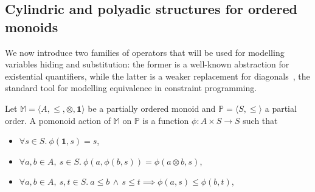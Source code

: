 \documentclass{llncs}
\newcommand{\comment}[1]{}
\def\monid{{\mathbf 0}}
\def\monop{\otimes}
\def\odiv{\, {\ominus\hspace{-7.7pt} \div} \,}
\def\monid{\mathbf{1}}
\begin{document}
\comment{
\begin{example}
\label{notdistr}
Let us consider the monoid $S = \langle \{p,u,n,t\}, \otimes_s, u \rangle$ (with $t$ the top 
of three otherwise unrelated elements): 
$p$ and $n$ intuitively represent the sign of an integer, $t$ tells us that 
the sign cannot be determined, $u$ is the zero
and $\otimes_s$ (which is idempotent) tells us the sign of the addition of two integers, so that 
for all elements $x$ we have
\[x \otimes_s x = u \otimes_s x = x \mbox{  and  } t \otimes_s x = p \otimes_s n = t\]
%
We now add the bottom, in order to obtain a complete lattice.
The $\otimes_s$ is extended in the expected way,  so that $\bot$ is absorbing.
%
Intuitively, $\bot$ states that an element is unsigned:
a pattern the reader familiar with abstract interpretation formalisms will recognise.

The resulting semi-lattice monoid is residuated, with $\odiv$ defined as

$$x \odiv y = \bigg \{\begin{array}{ll}
	t & y \leq x \\
	\bot & \ otherwise
	\end{array}$$
%
Thus, $\odiv$ does not distribute, since 
$\bigvee \{p \odiv n, u \odiv n\}  = \bot < \bigvee \{p, u\} \odiv n = t \odiv n = t$.
\end{example}
}

\subsection{Cylindric and polyadic structures for ordered monoids}
\label{cypo}
We now introduce two families of operators that will be used
for modelling variables hiding and substitution:
%
the former is a well-known abstraction for existential quantifiers,
while the latter is a weaker replacement for diagonals~\cite{popl91}, 
the standard tool for modelling equivalence in constraint programming.
%

\begin{definition}
\label{pomo}
Let $\mathbb{M} = \langle A, \leq, \monop, \monid \rangle$ be a partially ordered monoid and $\mathbb{P} = \langle S, \leq \rangle$ a partial order.
A pomonoid action of $\mathbb{M}$ on $\mathbb{P}$ is a function $\phi: A \times S \rightarrow S$ such that
	\begin{itemize}
	     \item $\forall s \in S.\ \phi(\monid, s) = s$,
             \item $\forall a, b \in A,\ s \in S.\ \phi(a, \phi(b, s)) = \phi(a \otimes b, s)$,
             \item $\forall a, b \in A,\ s, t \in S.\ a \leq b\, \wedge\, s \leq t \implies \phi(a, s) \leq \phi (b, t)$,
	\end{itemize}
\end{definition}
\end{document}
